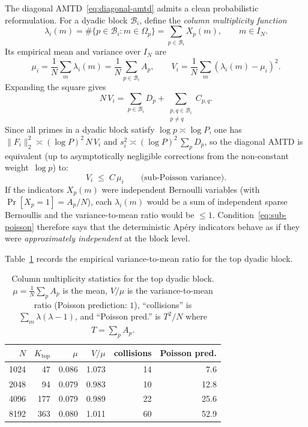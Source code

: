 \documentclass[11pt]{article}
\theoremstyle{definition}
\theoremstyle{remark}
\begin{document}
The diagonal AMTD~\eqref{eq:diagonal-amtd} admits a
clean probabilistic reformulation.
For a dyadic block $\mathcal{B}_i$, define
the \emph{column multiplicity function}
\[
  \lambda_i(m)
  = \#\{p \in \mathcal{B}_i : m \in \Omega_p\}
  = \sum_{p \in \mathcal{B}_i} X_p(m),
  \qquad m \in I_N.
\]
Its empirical mean and variance over $I_N$ are
\[
  \mu_i = \frac{1}{N}\sum_{m} \lambda_i(m)
  = \frac{1}{N}\sum_{p \in \mathcal{B}_i} A_p,
  \qquad
  V_i = \frac{1}{N}\sum_m (\lambda_i(m) - \mu_i)^2.
\]
Expanding the square gives
\[
  N\,V_i
  = \sum_{p \in \mathcal{B}_i} D_p
  + \sum_{\substack{p,q \in \mathcal{B}_i \\ p \neq q}}
  C_{p,q}.
\]
Since all primes in a dyadic block satisfy
$\log p \asymp \log P$, one has
$\|F_i\|_2^2 \asymp (\log P)^2\,N\,V_i$
and $s_i^2 \asymp (\log P)^2\,\sum_p D_p$,
so the diagonal AMTD is equivalent (up to
asymptotically negligible corrections from
the non-constant weight~$\log p$) to:
\begin{equation}\label{eq:sub-poisson}
  V_i \;\le\; C\,\mu_i
  \qquad\text{(sub-Poisson variance)}.
\end{equation}
If the indicators $X_p(m)$ were independent
Bernoulli variables (with $\Pr[X_p = 1] = A_p/N$),
each $\lambda_i(m)$ would be a sum of independent
sparse Bernoullis and the variance-to-mean ratio
would be $\le 1$.
Condition~\eqref{eq:sub-poisson} therefore says
that the deterministic Ap\'ery indicators behave
as if they were \emph{approximately independent}
at the block level.

Table~\ref{tab:poisson} records the empirical
variance-to-mean ratio for the top dyadic block.

\begin{table}[ht]
\centering
\begin{tabular}{rrrrrr}
\toprule
$N$ & $K_{\mathrm{top}}$ & $\mu$ & $V/\mu$ & collisions & Poisson pred. \\
\midrule
1024 &  47 & 0.086 & 1.073 &  14 &  7.6 \\
2048 &  94 & 0.079 & 0.983 &  10 & 12.8 \\
4096 & 177 & 0.079 & 0.989 &  22 & 25.6 \\
8192 & 363 & 0.080 & 1.011 &  60 & 52.9 \\
\bottomrule
\end{tabular}
\caption{Column multiplicity statistics for the
top dyadic block.
$\mu = \tfrac{1}{N}\sum_p A_p$ is the mean,
$V/\mu$ is the variance-to-mean ratio
(Poisson prediction: $1$),
``collisions'' is $\sum_m \lambda(\lambda-1)$,
and ``Poisson pred.'' is $T^2/N$
where $T = \sum_p A_p$.}
\label{tab:poisson}
\end{table}
\end{document}
